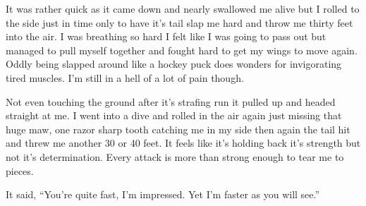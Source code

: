\parasep{}

It was rather quick as it came down and nearly swallowed me alive but I rolled to the side just in time only to have it's tail slap me hard and throw me thirty feet into the air. I was breathing so hard I felt like I was going to pass out but managed to pull myself together and fought hard to get my wings to move again. Oddly being slapped around like a hockey puck does wonders for invigorating tired muscles. I'm still in a hell of a lot of pain though.

Not even touching the ground after it's strafing run it pulled up and headed straight at me. I went into a dive and rolled in the air again just missing that huge maw, one razor sharp tooth catching me in my side then again the tail hit and threw me another 30 or 40 feet. It feels like it's holding back it's strength but not it's determination. Every attack is more than strong enough to tear me to pieces.

It said, ``You're quite fast, I'm impressed. Yet I'm faster as you will see.''





















